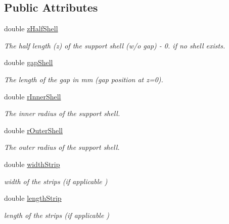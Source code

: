 \subsection*{Public Attributes}
\begin{DoxyCompactItemize}
\item 
double \hyperlink{struct_d_d4hep_1_1_d_d_rec_1_1_z_planar_struct_acd368faf55766bd4b57296660458185c}{zHalfShell}
\begin{DoxyCompactList}\small\item\em The half length (z) of the support shell (w/o gap) -\/ 0. if no shell exists. \item\end{DoxyCompactList}\item 
double \hyperlink{struct_d_d4hep_1_1_d_d_rec_1_1_z_planar_struct_a5136dbae308df17406ebd522459899ca}{gapShell}
\begin{DoxyCompactList}\small\item\em The length of the gap in mm (gap position at z=0). \item\end{DoxyCompactList}\item 
double \hyperlink{struct_d_d4hep_1_1_d_d_rec_1_1_z_planar_struct_a34989dd51686b6107bf9d322eabf76b0}{rInnerShell}
\begin{DoxyCompactList}\small\item\em The inner radius of the support shell. \item\end{DoxyCompactList}\item 
double \hyperlink{struct_d_d4hep_1_1_d_d_rec_1_1_z_planar_struct_a298b12433c81ef9750730620293f7cfa}{rOuterShell}
\begin{DoxyCompactList}\small\item\em The outer radius of the support shell. \item\end{DoxyCompactList}\item 
double \hyperlink{struct_d_d4hep_1_1_d_d_rec_1_1_z_planar_struct_af557ea4c315a65436763c0b2b91750ff}{widthStrip}
\begin{DoxyCompactList}\small\item\em width of the strips (if applicable ) \item\end{DoxyCompactList}\item 
double \hyperlink{struct_d_d4hep_1_1_d_d_rec_1_1_z_planar_struct_ae17170e893c4b0a60f3757bffac7b3c9}{lengthStrip}
\begin{DoxyCompactList}\small\item\em length of the strips (if applicable ) \item\end{DoxyCompactList}\item 

\end{DoxyCompactItemize}
